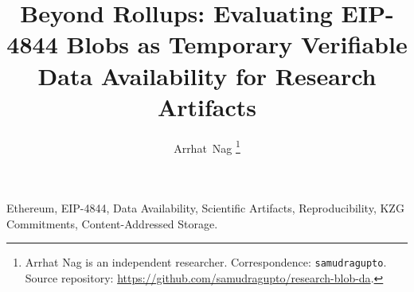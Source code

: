 \documentclass[journal,10pt,twocolumn]{IEEEtran}
\title{Beyond Rollups: Evaluating EIP-4844 Blobs as Temporary Verifiable Data Availability for Research Artifacts}
\author{
    Arrhat~Nag%
    \thanks{Arrhat Nag is an independent researcher. Correspondence: \texttt{samudragupto}. Source repository: \url{https://github.com/samudragupto/research-blob-da}.}
}
\begin{document}
\maketitle



\begin{IEEEkeywords}
Ethereum, EIP-4844, Data Availability, Scientific Artifacts, Reproducibility, KZG Commitments, Content-Addressed Storage.
\end{IEEEkeywords}
















\end{document}
